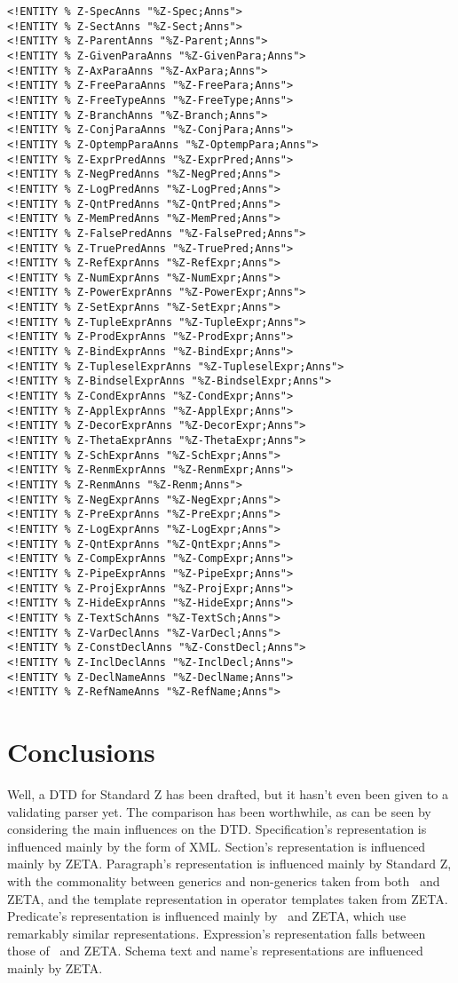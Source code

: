 \documentclass[a4paper,10pt]{article}
\def\Zeta{{\sf Z{\small E}T{\small A}}}
\begin{document}
\begin{verbatim}
<!ENTITY % Z-SpecAnns "%Z-Spec;Anns">
<!ENTITY % Z-SectAnns "%Z-Sect;Anns">
<!ENTITY % Z-ParentAnns "%Z-Parent;Anns">
<!ENTITY % Z-GivenParaAnns "%Z-GivenPara;Anns">
<!ENTITY % Z-AxParaAnns "%Z-AxPara;Anns">
<!ENTITY % Z-FreeParaAnns "%Z-FreePara;Anns">
<!ENTITY % Z-FreeTypeAnns "%Z-FreeType;Anns">
<!ENTITY % Z-BranchAnns "%Z-Branch;Anns">
<!ENTITY % Z-ConjParaAnns "%Z-ConjPara;Anns">
<!ENTITY % Z-OptempParaAnns "%Z-OptempPara;Anns">
<!ENTITY % Z-ExprPredAnns "%Z-ExprPred;Anns">
<!ENTITY % Z-NegPredAnns "%Z-NegPred;Anns">
<!ENTITY % Z-LogPredAnns "%Z-LogPred;Anns">
<!ENTITY % Z-QntPredAnns "%Z-QntPred;Anns">
<!ENTITY % Z-MemPredAnns "%Z-MemPred;Anns">
<!ENTITY % Z-FalsePredAnns "%Z-FalsePred;Anns">
<!ENTITY % Z-TruePredAnns "%Z-TruePred;Anns">
<!ENTITY % Z-RefExprAnns "%Z-RefExpr;Anns">
<!ENTITY % Z-NumExprAnns "%Z-NumExpr;Anns">
<!ENTITY % Z-PowerExprAnns "%Z-PowerExpr;Anns">
<!ENTITY % Z-SetExprAnns "%Z-SetExpr;Anns">
<!ENTITY % Z-TupleExprAnns "%Z-TupleExpr;Anns">
<!ENTITY % Z-ProdExprAnns "%Z-ProdExpr;Anns">
<!ENTITY % Z-BindExprAnns "%Z-BindExpr;Anns">
<!ENTITY % Z-TupleselExprAnns "%Z-TupleselExpr;Anns">
<!ENTITY % Z-BindselExprAnns "%Z-BindselExpr;Anns">
<!ENTITY % Z-CondExprAnns "%Z-CondExpr;Anns">
<!ENTITY % Z-ApplExprAnns "%Z-ApplExpr;Anns">
<!ENTITY % Z-DecorExprAnns "%Z-DecorExpr;Anns">
<!ENTITY % Z-ThetaExprAnns "%Z-ThetaExpr;Anns">
<!ENTITY % Z-SchExprAnns "%Z-SchExpr;Anns">
<!ENTITY % Z-RenmExprAnns "%Z-RenmExpr;Anns">
<!ENTITY % Z-RenmAnns "%Z-Renm;Anns">
<!ENTITY % Z-NegExprAnns "%Z-NegExpr;Anns">
<!ENTITY % Z-PreExprAnns "%Z-PreExpr;Anns">
<!ENTITY % Z-LogExprAnns "%Z-LogExpr;Anns">
<!ENTITY % Z-QntExprAnns "%Z-QntExpr;Anns">
<!ENTITY % Z-CompExprAnns "%Z-CompExpr;Anns">
<!ENTITY % Z-PipeExprAnns "%Z-PipeExpr;Anns">
<!ENTITY % Z-ProjExprAnns "%Z-ProjExpr;Anns">
<!ENTITY % Z-HideExprAnns "%Z-HideExpr;Anns">
<!ENTITY % Z-TextSchAnns "%Z-TextSch;Anns">
<!ENTITY % Z-VarDeclAnns "%Z-VarDecl;Anns">
<!ENTITY % Z-ConstDeclAnns "%Z-ConstDecl;Anns">
<!ENTITY % Z-InclDeclAnns "%Z-InclDecl;Anns">
<!ENTITY % Z-DeclNameAnns "%Z-DeclName;Anns">
<!ENTITY % Z-RefNameAnns "%Z-RefName;Anns">
\end{verbatim}

\section{Conclusions}

Well, a DTD for Standard Z has been drafted,
but it hasn't even been given to a validating parser yet.
The comparison has been worthwhile,
as can be seen by considering the main influences on the DTD.
Specification's representation is influenced mainly by the form of XML.
Section's representation is influenced mainly by \Zeta.
Paragraph's representation is influenced mainly by Standard Z,
with the commonality between generics and non-generics taken from
both \CADiZ\ and \Zeta,
and the template representation in operator templates taken from \Zeta.
Predicate's representation is influenced mainly by \CADiZ\ and \Zeta,
which use remarkably similar representations.
Expression's representation falls between those of \CADiZ\ and \Zeta.
Schema text and name's representations are influenced mainly by \Zeta.
\end{document}
